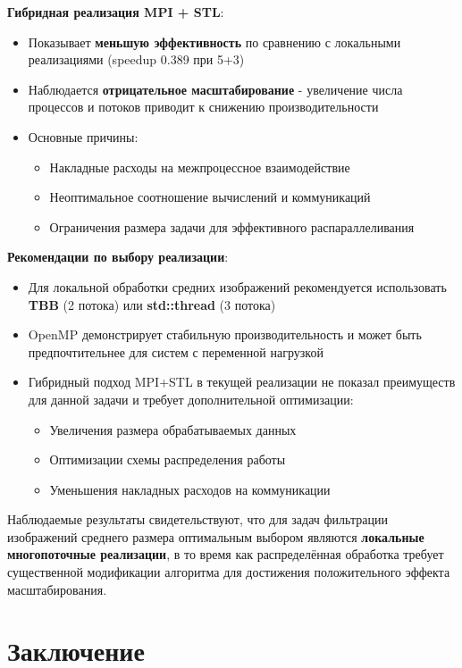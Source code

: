 \documentclass[12pt]{article}
\begin{document}
\textbf{Гибридная реализация MPI + STL}:
\begin{itemize}
\item Показывает \textbf{меньшую эффективность} по сравнению с локальными реализациями (speedup 0.389 при 5+3)
\item Наблюдается \textbf{отрицательное масштабирование} - увеличение числа процессов и потоков приводит к снижению производительности
\item Основные причины:
\begin{itemize}
\item Накладные расходы на межпроцессное взаимодействие
\item Неоптимальное соотношение вычислений и коммуникаций
\item Ограничения размера задачи для эффективного распараллеливания
\end{itemize}
\end{itemize}

\textbf{Рекомендации по выбору реализации}:
\begin{itemize}
\item Для локальной обработки средних изображений рекомендуется использовать \textbf{TBB} (2 потока) или \textbf{std::thread} (3 потока)
\item OpenMP демонстрирует стабильную производительность и может быть предпочтительнее для систем с переменной нагрузкой
\item Гибридный подход MPI+STL в текущей реализации не показал преимуществ для данной задачи и требует дополнительной оптимизации:
\begin{itemize}
\item Увеличения размера обрабатываемых данных
\item Оптимизации схемы распределения работы
\item Уменьшения накладных расходов на коммуникации
\end{itemize}
\end{itemize}

Наблюдаемые результаты свидетельствуют, что для задач фильтрации изображений среднего размера оптимальным выбором являются \textbf{локальные многопоточные реализации}, в то время как распределённая обработка требует существенной модификации алгоритма для достижения положительного эффекта масштабирования.
\section{Заключение}
\end{document}
